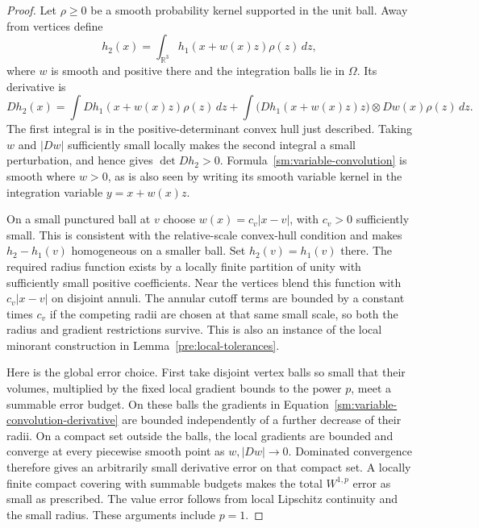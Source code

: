 \documentclass[11pt]{article}
\numberwithin{equation}{section}
\theoremstyle{definition}
\theoremstyle{remark}
\newcommand{\R}{\mathbb R}
\begin{document}
\begin{proof}
Let $\rho\ge0$ be a smooth probability kernel supported in the
unit ball.  Away from vertices define
\begin{equation}
 \label{sm:variable-convolution}
 h_2(x)=\int_{\R^3}h_1(x+w(x)z)\rho(z)\,dz,
\end{equation}
where $w$ is smooth and positive there and the integration balls
lie in $\Omega$.  Its derivative is
\begin{equation}
 \label{sm:variable-convolution-derivative}
 Dh_2(x)=\int Dh_1(x+w(x)z)\rho(z)\,dz
 +\int \bigl(Dh_1(x+w(x)z)z\bigr)\otimes Dw(x)\rho(z)\,dz.
\end{equation}
The first integral is in the positive-determinant convex hull just
described.  Taking $w$ and $|Dw|$ sufficiently small locally makes
the second integral a small perturbation, and hence gives
$\det Dh_2>0$.  Formula~\eqref{sm:variable-convolution} is smooth
where $w>0$, as is also seen by writing its smooth variable kernel
in the integration variable $y=x+w(x)z$.

On a small punctured ball at $v$ choose
$w(x)=c_v|x-v|$, with $c_v>0$ sufficiently small.  This is
consistent with the relative-scale convex-hull condition and
makes $h_2-h_1(v)$ homogeneous on a smaller ball.  Set
$h_2(v)=h_1(v)$ there.  The required radius function exists by
a locally finite partition of unity with sufficiently small
positive coefficients.  Near the vertices blend this function
with $c_v|x-v|$ on disjoint annuli.  The annular cutoff terms
are bounded by a constant times $c_v$ if the competing radii
are chosen at that same small scale, so both the radius and
gradient restrictions survive.  This is also an instance of
the local minorant construction in Lemma~\ref{pre:local-tolerances}.

Here is the global error choice.  First take disjoint vertex balls
so small that their volumes, multiplied by the fixed local
gradient bounds to the power $p$, meet a summable error budget.
On these balls the gradients in
Equation~\eqref{sm:variable-convolution-derivative} are bounded independently
of a further decrease of their radii.  On a compact set outside
the balls, the local gradients are bounded and converge at every
piecewise smooth point as $w,|Dw|\to0$.  Dominated convergence
therefore gives an arbitrarily small derivative error on that
compact set.  A locally finite compact covering with summable
budgets makes the total $W^{1,p}$ error as small as prescribed.
The value error follows from local Lipschitz continuity and the
small radius.  These arguments include $p=1$.


\end{proof}
\end{document}

